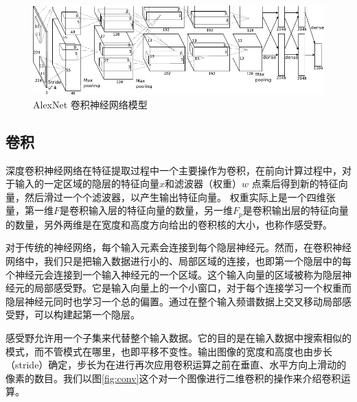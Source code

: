 \begin{figure}
  \centering
  \includegraphics[width=13.5cm]{figures/networks/alexnetarchitecture}
  \caption{ AlexNet 卷积神经网络模型}
  \label{fig:cnn_network}
\end{figure}



\subsection{卷积}

深度卷积神经网络在特征提取过程中一个主要操作为卷积，在前向计算过程中，对于输入的一定区域的隐层的特征向量$x$和滤波器（权重）$w$ 点乘后得到新的特征向量，然后滑过一个个滤波器，以产生输出特征向量。
权重实际上是一个四维张量，第一维$ F $是卷积输入层的特征向量的数量，另一维$ F_p $是卷积输出层的特征向量的数量，另外两维是在宽度和高度方向给出的卷积核的大小，也称作感受野。

对于传统的神经网络，每个输入元素会连接到每个隐层神经元。然而，在卷积神经网络中，我们只是把输入数据进行小的、局部区域的连接，也即第一个隐层中的每个神经元会连接到一个输入神经元的一个区域。这个输入向量的区域被称为隐层神经元的局部感受野。它是输入向量上的一个小窗口，对于每个连接学习一个权重而隐层神经元同时也学习一个总的偏置。通过在整个输入频谱数据上交叉移动局部感受野，可以构建起第一个隐层。

感受野允许用一个子集来代替整个输入数据。它的目的是在输入数据中搜索相似的模式，而不管模式在哪里，也即平移不变性。输出图像的宽度和高度也由步长（stride）确定，步长为在进行再次应用卷积运算之前在垂直、水平方向上滑动的像素的数目。我们以图\ref{fig:conv}这个对一个图像进行二维卷积的操作来介绍卷积运算。

